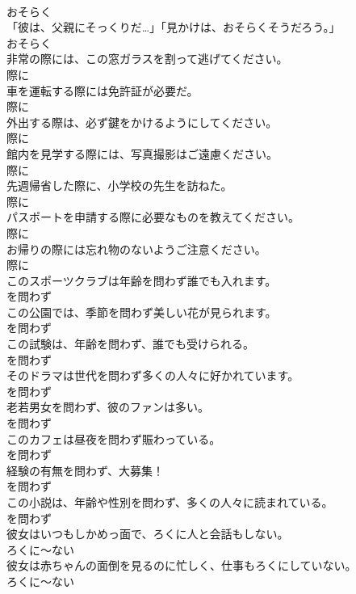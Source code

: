 \documentclass[8pt]{extreport}
\begin{document}
\begin{CJK}{UTF8}{min}
\\	おそらく
\\	「彼は、父親にそっくりだ…」「見かけは、おそらくそうだろう。」	
\\	おそらく
\\	非常の際には、この窓ガラスを割って逃げてください。	
\\	際に
\\	車を運転する際には免許証が必要だ。	
\\	際に
\\	外出する際は、必ず鍵をかけるようにしてください。	
\\	際に
\\	館内を見学する際には、写真撮影はご遠慮ください。	
\\	際に
\\	先週帰省した際に、小学校の先生を訪ねた。	
\\	際に
\\	パスポートを申請する際に必要なものを教えてください。	
\\	際に
\\	お帰りの際には忘れ物のないようご注意ください。	
\\	際に
\\	このスポーツクラブは年齢を問わず誰でも入れます。	
\\	を問わず
\\	この公園では、季節を問わず美しい花が見られます。	
\\	を問わず
\\	この試験は、年齢を問わず、誰でも受けられる。	
\\	を問わず
\\	そのドラマは世代を問わず多くの人々に好かれています。	
\\	を問わず
\\	老若男女を問わず、彼のファンは多い。	
\\	を問わず
\\	このカフェは昼夜を問わず賑わっている。	
\\	を問わず
\\	経験の有無を問わず、大募集！	
\\	を問わず
\\	この小説は、年齢や性別を問わず、多くの人々に読まれている。	
\\	を問わず
\\	彼女はいつもしかめっ面で、ろくに人と会話もしない。	
\\	ろくに～ない
\\	彼女は赤ちゃんの面倒を見るのに忙しく、仕事もろくにしていない。	
\\	ろくに～ない

\end{CJK}
\end{document}
